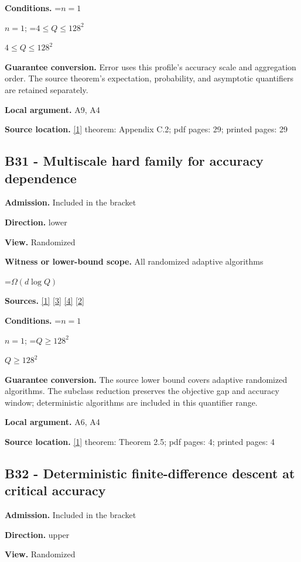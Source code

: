 \documentclass[10pt,a4paper]{article}
\newcommand{\AtlasMath}[1]{\par\begingroup\centering\setbox0=\hbox{$\displaystyle #1$}\ifdim\wd0>1.4\linewidth\typeout{ATLAS WIDE FORMULA: \the\wd0}\fi\ifdim\wd0>\linewidth\resizebox{\linewidth}{!}{\box0}\else\box0\fi\par\endgroup}
\newcommand{\AtlasInlineMath}[1]{\begingroup\setbox0=\hbox{$#1$}\ifdim\wd0>.4\linewidth\endgroup\AtlasMath{#1}\else\endgroup$#1$\fi}
\begin{document}
\textbf{Conditions.} \AtlasInlineMath{n=1}; \AtlasInlineMath{4\le Q\le128^2}

\textbf{Guarantee conversion.} Error uses this profile's accuracy scale and aggregation order. The source theorem's expectation, probability, and asymptotic quantifiers are retained separately.

\textbf{Local argument.} A9, A4

\textbf{Source location.} \href{https://arxiv.org/html/2610.00345v1}{[1]} theorem: Appendix C.2; pdf pages: 29; printed pages: 29

\subsection{B31 - Multiscale hard family for accuracy dependence}
\textbf{Admission.} Included in the bracket

\textbf{Direction.} lower

\textbf{View.} Randomized

\textbf{Witness or lower-bound scope.} All randomized adaptive algorithms

\AtlasMath{\Omega(d\log Q)}
\textbf{Sources.} \href{https://arxiv.org/html/2610.00345v1}{[1]} \href{https://arxiv.org/html/2607.16558v2}{[3]} \href{https://www.mathnet.ru/php/archive.phtml?jrnid=mzm&option_lang=eng&paperid=1697&wshow=paper}{[4]} \href{https://arxiv.org/abs/2109.08858}{[2]}

\textbf{Conditions.} \AtlasInlineMath{n=1}; \AtlasInlineMath{Q\ge128^2}

\textbf{Guarantee conversion.} The source lower bound covers adaptive randomized algorithms. The subclass reduction preserves the objective gap and accuracy window; deterministic algorithms are included in this quantifier range.

\textbf{Local argument.} A6, A4

\textbf{Source location.} \href{https://arxiv.org/html/2610.00345v1}{[1]} theorem: Theorem 2.5; pdf pages: 4; printed pages: 4

\subsection{B32 - Deterministic finite-difference descent at critical accuracy}
\textbf{Admission.} Included in the bracket

\textbf{Direction.} upper

\textbf{View.} Randomized
\end{document}

